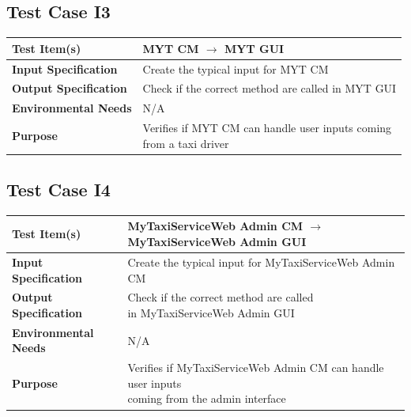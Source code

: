 \documentclass[11pt,titlepage]{article} %
\begin{document}
  \subsection{Test Case I3}
  \begin{table}[ht!]
    \begin{tabular*}{16cm}{ll}
	\hline
	\textbf{Test Item(s)} & MYT CM $ \longrightarrow $ MYT GUI \\
	\hline
	\textbf{Input Specification} & Create the typical input for MYT CM\\
	\hline
	\textbf{Output Specification} & Check if the correct method are called in MYT GUI\\
	\hline
	\textbf{Environmental Needs} & N/A\\
	\hline 
	\textbf{Purpose} & \pbox{20cm}{Verifies if MYT CM can handle user inputs coming \\ from a taxi driver} \\
	\hline
    \end{tabular*}
  \end{table}
  
  \subsection{Test Case I4}
  \begin{table}[H]
    \begin{tabular*}{16cm}{ll}
	\hline
	\textbf{Test Item(s)} & MyTaxiServiceWeb Admin CM $ \longrightarrow $ MyTaxiServiceWeb Admin GUI \\
	\hline
	\textbf{Input Specification} & Create the typical input for MyTaxiServiceWeb Admin CM\\
	\hline
	\textbf{Output Specification} & \pbox{20cm}{Check if the correct method are called \\ in MyTaxiServiceWeb Admin GUI} \\
	\hline
	\textbf{Environmental Needs} & N/A\\
	\hline
	\textbf{Purpose} & \pbox{20cm}{Verifies if MyTaxiServiceWeb Admin CM can handle user inputs \\ coming from the admin interface} \\
	\hline
    \end{tabular*}
  \end{table}
  
\end{document}
